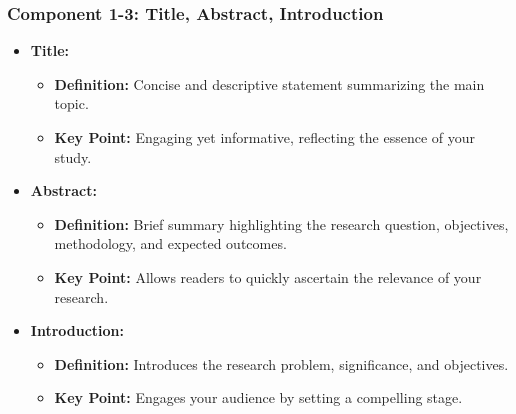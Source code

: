 \documentclass[aspectratio=169]{beamer}
\begin{document}
\begin{frame}[fragile]
  \frametitle{Component 1-3: Title, Abstract, Introduction}
  \begin{itemize}
    \item \textbf{Title:}
      \begin{itemize}
        \item \textbf{Definition:} Concise and descriptive statement summarizing the main topic.
        \item \textbf{Key Point:} Engaging yet informative, reflecting the essence of your study.
      \end{itemize}
    \item \textbf{Abstract:}
      \begin{itemize}
        \item \textbf{Definition:} Brief summary highlighting the research question, objectives, methodology, and expected outcomes.
        \item \textbf{Key Point:} Allows readers to quickly ascertain the relevance of your research.
      \end{itemize}
    \item \textbf{Introduction:}
      \begin{itemize}
        \item \textbf{Definition:} Introduces the research problem, significance, and objectives.
        \item \textbf{Key Point:} Engages your audience by setting a compelling stage.
      \end{itemize}
  \end{itemize}
\end{frame}
\end{document}
